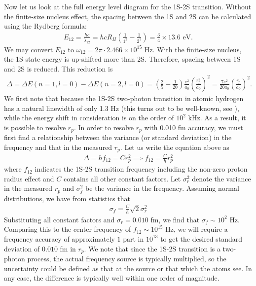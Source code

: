 \documentclass{article}
\theoremstyle{definition}
\newcommand{\f}[2]{\frac{#1}{#2}}
\newcommand{\lp}{\left(}
\newcommand{\rp}{\right)}
\begin{document}
\begin{enumerate}[label=(\alph*)]
	
	
	Now let us look at the full energy level diagram for the 1S-2S transition. Without the finite-size nucleus effect, the spacing between the 1S and 2S can be calculated using the Rydberg formula:
	\begin{align*}
	E_{12} = \f{hc}{\lambda_{12}} = hc R_H \lp \f{1}{1^2} - \f{1}{2^2} \rp = \f{3}{4} \times  13.6 \text{ eV}.
	\end{align*}
	We may convert $E_{12}$ to $\omega_{12} = 2\pi \cdot 2.466 \times 10^{15} \text{ Hz}$. With the finite-size nucleus, the 1S state energy is up-shifted more than 2S. Therefore, spacing between 1S and 2S is reduced. This reduction is 
	\begin{align*}
	\Delta = \Delta E(n=1,l=0) - \Delta E(n=2,l=0) = \lp \f{2}{5} - \f{1}{20} \rp \f{e^2}{a_0} \lp \f{r_p^2}{a_0} \rp^2 = \f{7e^2}{20a_0} \lp \f{r_p}{a_0} \rp^2. 
	\end{align*}
	We first note that because the 1S-2S two-photon transition in atomic hydrogen has a natural linewidth of only 1.3 Hz (this turns out to be well-known, see \cite{udem1997phase}), while the energy shift in consideration is on the order of $10^2$ kHz. As a result, it is possible to resolve $r_p$. In order to resolve $r_p$ with 0.010 fm accuracy, we must first find a relationship between the variance (or standard deviation) in the frequency and that in the measured $r_p$. Let us write the equation above as 
	\begin{align*}
	\Delta = hf_{12} = C r_p^2 \implies f_{12} = \f{C}{h} r_p^2
	\end{align*}
	where $f_{12}$ indicates the 1S-2S transition frequency including the non-zero proton radius effect and $C$ contains all other constant factors. Let $\sigma_{r}^2$ denote the variance in the measured $r_p$ and $\sigma^2_f$ be the variance in the frequency. Assuming normal distributions, we have from statistics that 
	\begin{align*}
	\sigma_f = \f{C}{h} \sqrt{2} \sigma_r^2
	\end{align*}
	Substituting all constant factors and $\sigma_r = 0.010$ fm, we find that $\boxed{\sigma_f \sim 10^2 \text{ Hz}}$. Comparing this to the center frequency of $f_{12} \sim 10^{15}$ Hz, we will require a frequency accuracy of approximately $\boxed{1 \text{ part in } 10^{13}}$ to get the desired standard deviation of $0.010$ fm in $r_p$. We note that since the 1S-2S transition is a two-photon process, the actual frequency source is typically multiplied, so the uncertainty could be defined as that at the source or that which the atoms see. In any case, the difference is typically well within one order of magnitude.  \\
	

\end{enumerate}
\end{document}

